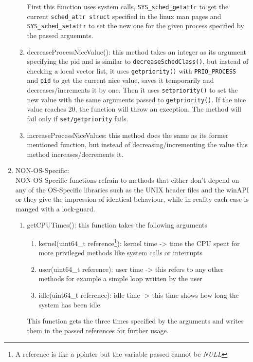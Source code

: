 \begin{enumerate}
\begin{enumerate}
		First this function uses system calls, \texttt{SYS\_sched\_getattr} to get the current \texttt{sched\_attr struct} specified in the linux man pages and \texttt{SYS\_sched\_setattr} to set the new one for the given process specified by the passed arguemnts.\cite{linux-man-set/getattribute}
		\item decreaseProcessNiceValue(): this method takes an integer as its argument specifying the pid and is similar to \texttt{decreaseSchedClass()}, but instead of checking a local vector list, it uses \texttt{getpriority()} with \texttt{PRIO\_PROCESS} and \texttt{pid} to get the current nice value, saves it temporarily and decreases/increments it by one. Then it uses \texttt{setpriority()} to set the new value with the same arguments passed to \texttt{getpriority()}. If the nice value reaches 20, the function will throw an exception. The method will fail only if \texttt{set/getpriority} fails.
		\item increaseProcessNiceValues: this method does the same as its former mentioned function, but instead of decreasing/incrementing the value this method increases/decrements it.
	\end{enumerate}
	\item NON-OS-Specific:\\
	NON-OS-Specific functions refrain to methods that either don't depend on any of the OS-Specific libraries such as the UNIX header files and the winAPI or they give the impression of identical behaviour, while in reality each case is manged with a lock-guard. 
	\begin{enumerate}
		\item getCPUTimes(): this function takes the following arguments
		\begin{enumerate}
			\item kernel(uint64\_t reference\footnote{A reference is like a pointer but the variable passed cannot be \textit{NULL}}): kernel time -> time the CPU spent for more \dq privileged\dq{} methods like system calls or interrupts
			\item user(uint64\_t reference): user time -> this refers to any other methods for example a simple loop written by the user
			\item idle(uint64\_t reference): idle time -> this time shows how long the system has been idle 
		\end{enumerate}
		This function gets the three times specified by the arguments and writes them in the passed references for further usage.\\

\end{enumerate}
\end{enumerate}
